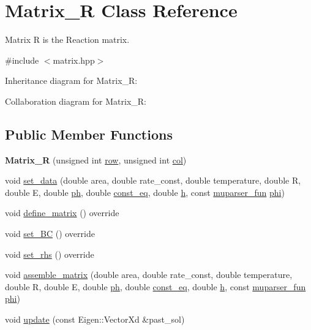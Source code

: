 \hypertarget{classMatrix__R}{}\section{Matrix\+\_\+R Class Reference}
\label{classMatrix__R}


Matrix R is the Reaction matrix.  




{\ttfamily \#include $<$matrix.\+hpp$>$}



Inheritance diagram for Matrix\+\_\+R\+:


Collaboration diagram for Matrix\+\_\+R\+:
\subsection*{Public Member Functions}
\begin{DoxyCompactItemize}
\item 
\mbox{\label{classMatrix__R_af03976837635a34f0d1b9ea585fda9fc}} 
{\bfseries Matrix\+\_\+R} (unsigned int \hyperlink{classAbstractMatrix_a27fb46bf2853d4927d92a81b8b7773fb}{row}, unsigned int \hyperlink{classAbstractMatrix_af3ad3551ce094979488cef5df0e4fc1d}{col})
\item 
void \hyperlink{classMatrix__R_a3892fa1560916146774ac953f9f6474c}{set\+\_\+data} (double area, double rate\+\_\+const, double temperature, double R, double E, double \hyperlink{classMatrix__R_ae8345433c06d0d0249c09783c4ff80bc}{ph}, double \hyperlink{classMatrix__R_ab5ca8aff010e279569065f76d28c4437}{const\+\_\+eq}, double \hyperlink{classMatrix__R_ac5bb79872f4324d89760f8047a1e63a4}{h}, const \hyperlink{classmuparser__fun}{muparser\+\_\+fun} \hyperlink{classMatrix__R_a8527ebc8844931d65e65c168956398ff}{phi})
\item 
void \hyperlink{classMatrix__R_a311aefa7be3bbb741d1958e840bc4613}{define\+\_\+matrix} () override
\item 
void \hyperlink{classMatrix__R_a33b829a44256d8d363891f3fc3d58244}{set\+\_\+\+BC} () override
\item 
void \hyperlink{classMatrix__R_a6305da2e94b8841f14061f3ad1ed9464}{set\+\_\+rhs} () override
\item 
void \hyperlink{classMatrix__R_a09330cb1b8c809a4a29364c5f7b101b6}{assemble\+\_\+matrix} (double area, double rate\+\_\+const, double temperature, double R, double E, double \hyperlink{classMatrix__R_ae8345433c06d0d0249c09783c4ff80bc}{ph}, double \hyperlink{classMatrix__R_ab5ca8aff010e279569065f76d28c4437}{const\+\_\+eq}, double \hyperlink{classMatrix__R_ac5bb79872f4324d89760f8047a1e63a4}{h}, const \hyperlink{classmuparser__fun}{muparser\+\_\+fun} \hyperlink{classMatrix__R_a8527ebc8844931d65e65c168956398ff}{phi})
\item 
void \hyperlink{classMatrix__R_ab896dfe91327ba364fdcaab15e7f2547}{update} (const Eigen\+::\+Vector\+Xd \&past\+\_\+sol)
\end{DoxyCompactItemize}
